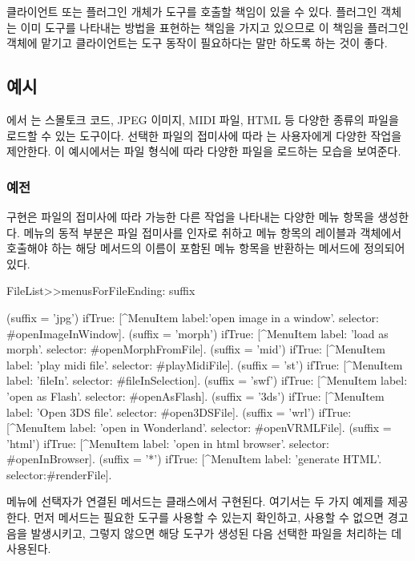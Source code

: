 \documentclass[a4paper,10pt,twoside]{book}
\begin{document}
클라이언트 또는 플러그인 개체가 도구를 호출할 책임이 있을 수 있다. 플러그인 객체는 이미 도구를 나타내는 방법을 표현하는 책임을 가지고 있으므로 이 책임을 플러그인 객체에 맡기고 클라이언트는 도구 동작이 필요하다는 말만 하도록 하는 것이 좋다.

\subsection*{예시}

 \cite{Inga97a}에서 는 스몰토크 코드, JPEG 이미지, MIDI 파일, HTML 등 다양한 종류의 파일을 로드할 수 있는 도구이다. 선택한 파일의 접미사에 따라 는 사용자에게 다양한 작업을 제안한다. 이 예시에서는 파일 형식에 따라 다양한 파일을 로드하는 모습을 보여준다.

\subsubsection*{예전}

 구현은 파일의 접미사에 따라 가능한 다른 작업을 나타내는 다양한 메뉴 항목을 생성한다. 메뉴의 동적 부분은 파일 접미사를 인자로 취하고 메뉴 항목의 레이블과  객체에서 호출해야 하는 해당 메서드의 이름이 포함된 메뉴 항목을 반환하는  메서드에 정의되어 있다.

\begin{code}
FileList>>menusForFileEnding: suffix

	(suffix = 'jpg') ifTrue:
		[^MenuItem label:'open image in a window'.
			selector: #openImageInWindow].
	(suffix = 'morph') ifTrue:
		[^MenuItem label: 'load as morph'.
			selector: #openMorphFromFile].
	(suffix = 'mid') ifTrue:
		[^MenuItem label: 'play midi file'.
			selector: #playMidiFile].
	(suffix = 'st') ifTrue:
		[^MenuItem label: 'fileIn'.
			selector: #fileInSelection].
	(suffix = 'swf') ifTrue:
		[^MenuItem label: 'open as Flash'.
			selector: #openAsFlash].
	(suffix = '3ds') ifTrue:
		[^MenuItem label: 'Open 3DS file'.
			selector: #open3DSFile].
	(suffix = 'wrl') ifTrue:
		[^MenuItem label: 'open in Wonderland'.
			selector: #openVRMLFile].
	(suffix = 'html') ifTrue:
		[^MenuItem label: 'open in html browser'.
			selector: #openInBrowser].
	(suffix = '*') ifTrue:
		[^MenuItem label: 'generate HTML'.
			selector:#renderFile].
\end{code}

메뉴에 선택자가 연결된 메서드는  클래스에서 구현된다. 여기서는 두 가지 예제를 제공한다. 먼저 메서드는 필요한 도구를 사용할 수 있는지 확인하고, 사용할 수 없으면 경고음을 발생시키고, 그렇지 않으면 해당 도구가 생성된 다음 선택한 파일을 처리하는 데 사용된다.
\end{document}

